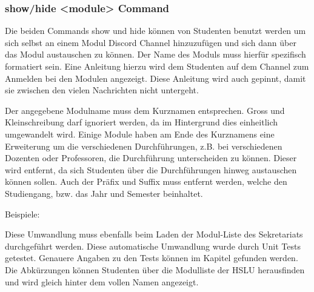 \documentclass[a4paper, table]{article}
\begin{document}
\subsubsection{show/hide <module> Command}

Die beiden Commands show und hide können von Studenten benutzt werden um sich selbst an einem Modul Discord Channel hinzuzufügen und sich dann über das Modul austauschen zu können.
Der Name des Moduls muss hierfür spezifisch formatiert sein.
Eine Anleitung hierzu wird dem Studenten auf dem Channel zum Anmelden bei den Modulen angezeigt.
Diese Anleitung wird auch gepinnt, damit sie zwischen den vielen Nachrichten nicht untergeht.

Der angegebene Modulname muss dem Kurznamen entsprechen.
Gross und Kleinschreibung darf ignoriert werden, da im Hintergrund dies einheitlich umgewandelt wird.
Einige Module haben am Ende des Kurznamens eine Erweiterung um die verschiedenen Durchführungen, z.B. bei verschiedenen Dozenten oder Professoren, die Durchführung unterscheiden zu können.
Dieser wird entfernt, da sich Studenten über die Durchführungen hinweg austauschen können sollen.
Auch der Präfix und Suffix muss entfernt werden, welche den Studiengang, bzw. das Jahr und Semester beinhaltet.

Beispiele:


Diese Umwandlung muss ebenfalls beim Laden der Modul-Liste des Sekretariats durchgeführt werden.
Diese automatische Umwandlung wurde durch Unit Tests getestet.
Genauere Angaben zu den Tests können im Kapitel  gefunden werden.
Die Abkürzungen können Studenten über die Modulliste der HSLU herausfinden und wird gleich hinter dem vollen Namen angezeigt.\autocite{noauthor_bachelor_nodate}
\end{document}
